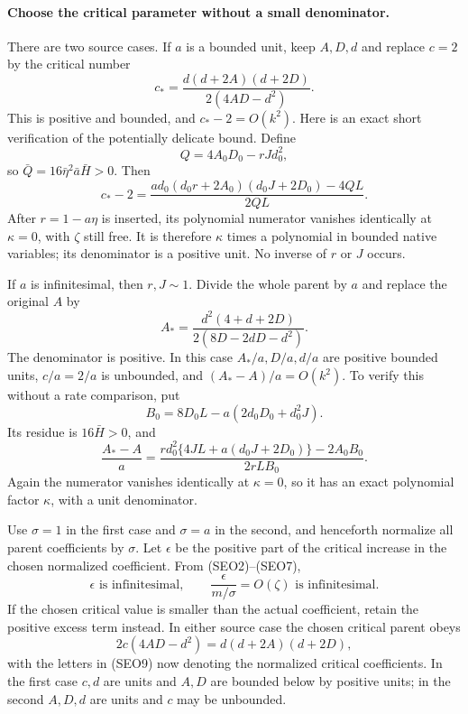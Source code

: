 \paragraph{Choose the critical parameter without a small denominator.}
There are two source cases. If $a$ is a bounded unit, keep $A,D,d$
and replace $c=2$ by the critical number
\[
 c_* =\frac{d(d+2A)(d+2D)}{2(4AD-d^2)}.
 \tag{SEO4}
\]
This is positive and bounded, and $c_*-2=O(k^2)$.
Here is an exact short verification of the potentially delicate bound.
Define
\[
 Q=4A_0D_0-rJd_0^2,
\]
so $\bar Q=16\bar\eta^2\bar a\bar H>0$. Then
\[
 c_*-2=
 \frac{ad_0(d_0r+2A_0)(d_0J+2D_0)-4QL}{2QL}.
 \tag{SEO5}
\]
After $r=1-a\eta$ is inserted, its polynomial numerator vanishes
identically at $\kappa=0$, with $\zeta$ still free. It is therefore
$\kappa$ times a polynomial in bounded native variables; its
denominator is a positive unit. No inverse of $r$ or $J$ occurs.

If $a$ is infinitesimal, then $r,J\sim1$. Divide the whole parent
by $a$ and replace the original $A$ by
\[
 A_* =\frac{d^2(4+d+2D)}{2(8D-2dD-d^2)}.       \tag{SEO6}
\]
The denominator is positive. In this case
$A_*/a,D/a,d/a$ are positive bounded units, $c/a=2/a$ is
unbounded, and $(A_*-A)/a=O(k^2)$. To verify this without a
rate comparison, put
\[
 B_0=8D_0L-a(2d_0D_0+d_0^2J).
\]
Its residue is $16\bar H>0$, and
\[
 \frac{A_*-A}{a}=
 \frac{r d_0^2\{4JL+a(d_0J+2D_0)\}-2A_0B_0}
 {2rLB_0}.                                           \tag{SEO7}
\]
Again the numerator vanishes identically at $\kappa=0$, so it has
an exact polynomial factor $\kappa$, with a unit denominator.

Use $\sigma=1$ in the first case and $\sigma=a$ in the second,
and henceforth normalize all parent coefficients by $\sigma$.
Let $\epsilon$ be the positive part of the critical increase in the
chosen normalized coefficient. From (SEO2)--(SEO7),
\[
 \epsilon\text{ is infinitesimal},\qquad
 \frac{\epsilon}{m/\sigma}=O(\zeta)\text{ is infinitesimal}.
 \tag{SEO8}
\]
If the chosen critical value is smaller than the actual coefficient,
retain the positive excess term instead. In either source case
the chosen critical parent obeys
\[
 2c(4AD-d^2)=d(d+2A)(d+2D),                  \tag{SEO9}
\]
with the letters in (SEO9) now denoting the normalized critical
coefficients. In the first case $c,d$ are units and $A,D$ are
bounded below by positive units; in the second $A,D,d$ are units
and $c$ may be unbounded.

